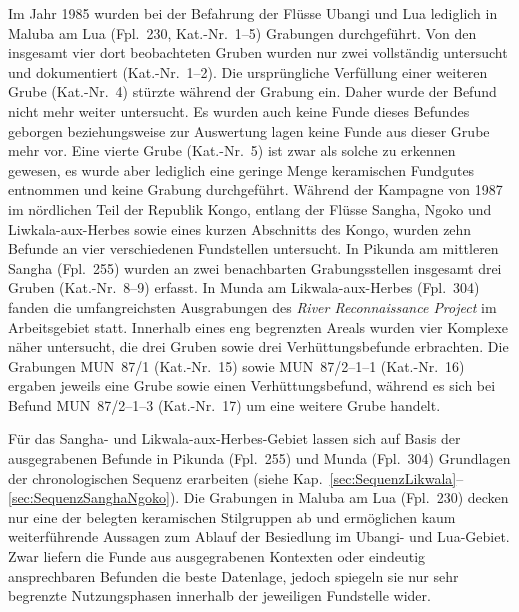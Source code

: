 \begin{multicols}{2}
Im Jahr 1985 wurden bei der Befahrung der Flüsse \mbox{Ubangi} und Lua lediglich in Maluba am Lua (Fpl.~230, Kat.-Nr.~1--5) Grabungen durchgeführt. Von den insgesamt vier dort beobachteten Gruben wurden nur zwei vollständig untersucht und dokumentiert (Kat.-Nr.~1--2). Die ursprüngliche Verfüllung einer weiteren Grube (Kat.-Nr.~4) stürzte während der Grabung ein. Daher wurde der Befund nicht mehr weiter untersucht. Es wurden auch keine Funde dieses Befundes geborgen beziehungsweise zur Auswertung lagen keine Funde aus dieser Grube mehr vor. Eine vierte Grube (Kat.-Nr.~5) ist zwar als solche zu erkennen gewesen, es wurde aber lediglich eine geringe Menge keramischen Fundgutes entnommen und keine Grabung durchgeführt. Während der Kampagne von 1987 im nördlichen Teil der Republik Kongo, entlang der Flüsse \mbox{Sangha}, \mbox{Ngoko} und Liwkala-aux-Herbes sowie eines kurzen Abschnitts des Kongo, wurden zehn Befunde an vier verschiedenen Fundstellen untersucht. In Pikunda am mittleren \mbox{Sangha} (Fpl.~255) wurden an zwei benachbarten Grabungsstellen insgesamt drei Gruben (Kat.-Nr.~8--9) erfasst. In Munda am \mbox{Likwala}-\mbox{aux}-\mbox{Herbes} (Fpl.~304) fanden die umfangreichsten Ausgrabungen des \textit{River Reconnaissance Project} im Arbeitsgebiet statt. Innerhalb eines eng begrenzten Areals wurden vier Komplexe näher untersucht, die drei Gruben sowie drei Verhüttungsbefunde erbrachten. Die Grabungen MUN~87/1 (Kat.-Nr.~15) sowie MUN~87/2--1--1 (Kat.-Nr.~16) ergaben jeweils eine Grube sowie einen Verhüttungsbefund, während es sich bei Befund MUN~87/2--1--3 (Kat.-Nr.~17) um eine weitere Grube handelt.

Für das \mbox{Sangha}- und Likwala-aux-Herbes-Gebiet lassen sich auf Basis der ausgegrabenen Befunde in Pikunda (Fpl.~255) und Munda (Fpl.~304) Grundlagen der chronologischen Sequenz erarbeiten (siehe Kap.~\ref{sec:SequenzLikwala}--\ref{sec:SequenzSanghaNgoko}). Die Grabungen in Maluba am Lua (Fpl.~230) decken nur eine der belegten keramischen Stilgruppen ab und ermöglichen kaum weiterführende Aussagen zum Ablauf der Besiedlung im \mbox{Ubangi}- und Lua-Gebiet. Zwar liefern die Funde aus ausgegrabenen Kontexten oder eindeutig ansprechbaren Befunden die beste Datenlage, jedoch spiegeln sie nur sehr begrenzte Nutzungsphasen innerhalb der jeweiligen Fundstelle wider.


\end{multicols}

